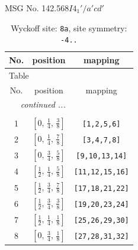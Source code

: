 \documentclass[fleqn,8pt]{jsarticle}
\begin{document}
\setcounter{MaxMatrixCols}{32}

\renewcommand{\tablename}{Table~}
\renewcommand{\figurename}{Figure~}
\begin{center}
\LARGE
MSG No. 142.568\quad$I4_{1}'/a'cd'$
\end{center}
\renewcommand{\arraystretch}{1.2}
\begin{longtable}{ccc}
\caption{Wyckoff site: {\tt 8a}, site symmetry: {\tt -4..}}
 \\
 \hline \hline
No. & position & mapping \\ \hline \endfirsthead

\multicolumn{2}{l}{\tablename\ \thetable{}} \\
 \hline \hline
No. & position & mapping \\ \hline \endhead

 \hline \hline
\multicolumn{2}{r}{\footnotesize\it continued ...} \\ \endfoot

 \hline \hline
\multicolumn{2}{r}{} \\ \endlastfoot

1 & $\left[ 0,\, \frac{1}{4},\, \frac{3}{8} \right]$ & {\tt [1,2,5,6]} \\ \hline
2 & $\left[ 0,\, \frac{1}{4},\, \frac{7}{8} \right]$ & {\tt [3,4,7,8]} \\ \hline
3 & $\left[ 0,\, \frac{3}{4},\, \frac{5}{8} \right]$ & {\tt [9,10,13,14]} \\ \hline
4 & $\left[ \frac{1}{2},\, \frac{1}{4},\, \frac{5}{8} \right]$ & {\tt [11,12,15,16]} \\ \hline
5 & $\left[ \frac{1}{2},\, \frac{3}{4},\, \frac{7}{8} \right]$ & {\tt [17,18,21,22]} \\ \hline
6 & $\left[ \frac{1}{2},\, \frac{3}{4},\, \frac{3}{8} \right]$ & {\tt [19,20,23,24]} \\ \hline
7 & $\left[ \frac{1}{2},\, \frac{1}{4},\, \frac{1}{8} \right]$ & {\tt [25,26,29,30]} \\ \hline
8 & $\left[ 0,\, \frac{3}{4},\, \frac{1}{8} \right]$ & {\tt [27,28,31,32]} \\
\end{longtable}
\renewcommand{\arraystretch}{1.2}
\end{document}
